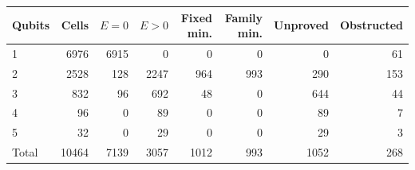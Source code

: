 \begin{center}\small\begin{tabular}{lrrrrrrr}\toprule
Qubits & Cells & $E=0$ & $E>0$ & Fixed min. & Family min. & Unproved & Obstructed\\\midrule
1 & 6976 & 6915 & 0 & 0 & 0 & 0 & 61\\
2 & 2528 & 128 & 2247 & 964 & 993 & 290 & 153\\
3 & 832 & 96 & 692 & 48 & 0 & 644 & 44\\
4 & 96 & 0 & 89 & 0 & 0 & 89 & 7\\
5 & 32 & 0 & 29 & 0 & 0 & 29 & 3\\
Total & 10464 & 7139 & 3057 & 1012 & 993 & 1052 & 268\\
\bottomrule\end{tabular}\end{center}
